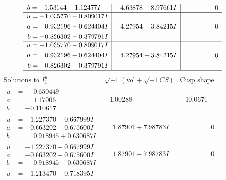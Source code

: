 \documentclass[1p]{elsarticle_modified}
\theoremstyle{definition}
\newcommand{\I}{\sqrt{-1}}
\begin{document}
$$\begin{array}{c|c|c}
\begin{aligned}
b &= \phantom{-}1.53144 - 1.12477 I\end{aligned}
 & \phantom{-}4.63878 - 8.97661 I & \phantom{-0.000000 } 0 \\ \hline\begin{aligned}
u &= -1.035770 + 0.809017 I \\
a &= \phantom{-}0.932196 - 0.624404 I \\
b &= -0.826302 - 0.379791 I\end{aligned}
 & \phantom{-}4.27954 + 3.84215 I & \phantom{-0.000000 } 0 \\ \hline\begin{aligned}
u &= -1.035770 - 0.809017 I \\
a &= \phantom{-}0.932196 + 0.624404 I \\
b &= -0.826302 + 0.379791 I\end{aligned}
 & \phantom{-}4.27954 - 3.84215 I & \phantom{-0.000000 } 0\\
 \hline 
 \end{array}$$\newpage$$\begin{array}{c|c|c}  
\text{Solutions to }I^u_{1}& \I (\text{vol} + \sqrt{-1}CS) & \text{Cusp shape}\\
 \hline 
\begin{aligned}
u &= \phantom{-}0.650449\phantom{ +0.000000I} \\
a &= \phantom{-}1.17006\phantom{ +0.000000I} \\
b &= -0.110617\phantom{ +0.000000I}\end{aligned}
 & -1.00288\phantom{ +0.000000I} & -10.0670\phantom{ +0.000000I} \\ \hline\begin{aligned}
u &= -1.227370 + 0.667999 I \\
a &= -0.663202 + 0.675600 I \\
b &= \phantom{-}0.918945 + 0.630687 I\end{aligned}
 & \phantom{-}1.87901 + 7.98783 I & \phantom{-0.000000 } 0 \\ \hline\begin{aligned}
u &= -1.227370 - 0.667999 I \\
a &= -0.663202 - 0.675600 I \\
b &= \phantom{-}0.918945 - 0.630687 I\end{aligned}
 & \phantom{-}1.87901 - 7.98783 I & \phantom{-0.000000 } 0 \\ \hline\begin{aligned}
u &= -1.213470 + 0.718395 I \\

\end{aligned}
\end{array}$$
\end{document}
